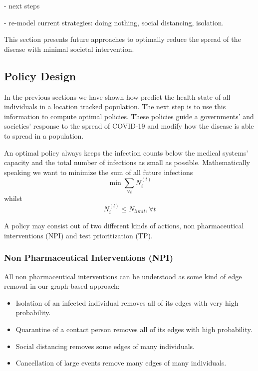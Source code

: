 - next steps

- re-model current strategies: doing nothing, social distancing, isolation.

This section presents future approaches to optimally reduce the spread of the disease with minimal societal intervention.


\subsection{Policy Design}
In the previous sections we have shown how predict the health state of all individuals in a location tracked population.
The next step is to use this information to compute optimal policies.
These policies guide a governments' and societies' response to the spread of COVID-19 and modify how the disease is able to spread in a population.

An optimal policy always keeps the infection counts below the medical systems' capacity and the total number of infections as small as possible.
Mathematically speaking we want to minimize the sum of all future infections
\begin{equation}
	\min \sum_{\forall t} N^{(t)}_i
\end{equation}
whilst
\begin{equation}
	N^{(l)}_i \leq N_{limit}, \forall t
\end{equation}

A policy may consist out of two different kinds of actions, non pharmaceutical interventions (NPI) and test prioritization (TP).


\subsubsection{Non Pharmaceutical Interventions (NPI)}
All non pharmaceutical interventions can be understood as some kind of edge removal in our graph-based approach:
\begin{itemize}
	\item Isolation of an infected individual removes all of its edges with very high probability.
	\item Quarantine of a contact person removes all of its edges with high probability.
	\item Social distancing removes some edges of many individuals.
	\item Cancellation of large events remove many edges of many individuals.
\end{itemize}

